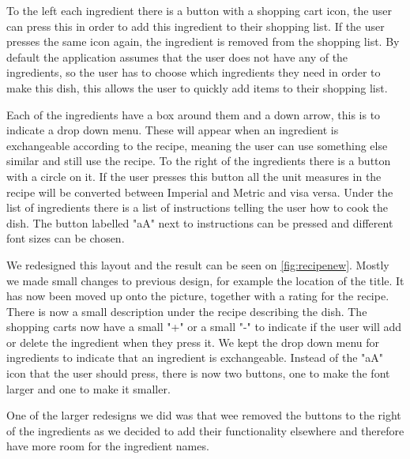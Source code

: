 To the left each ingredient there is a button with a shopping cart icon, the user can press this in order to add this ingredient to their shopping list. If the user presses the same icon again, the ingredient is removed from the shopping list. By default the application assumes that the user does not have any of the ingredients, so the user has to choose which ingredients they need in order to make this dish, this allows the user to quickly add items to their shopping list. 

Each of the ingredients have a box around them and a down arrow, this is to indicate a drop down menu. These will appear when an ingredient is exchangeable according to the recipe, meaning the user can use something else similar and still use the recipe. To the right of the ingredients there is a button with a circle on it. If the user presses this button all the unit measures in the recipe will be converted between Imperial and Metric and visa versa. Under the list of ingredients there is a list of instructions telling the user how to cook the dish. The button labelled "aA" next to instructions can be pressed and different font sizes can be chosen. 

We redesigned this layout and the result can be seen on \autoref{fig:recipenew}. Mostly we made small changes to previous design, for example the location of the title. It has now been moved up onto the picture, together with a rating for the recipe. There is now a small description under the recipe describing the dish. The shopping carts now have a small "+" or a small "-" to indicate if the user will add or delete the ingredient when they press it. We kept the drop down menu for ingredients to indicate that an ingredient is exchangeable. Instead of the "aA" icon that the user should press, there is now two buttons, one to make the font larger and one to make it smaller.

One of the larger redesigns we did was that wee removed the buttons to the right of the ingredients as we decided to add their functionality elsewhere and therefore have more room for the ingredient names. 
 
